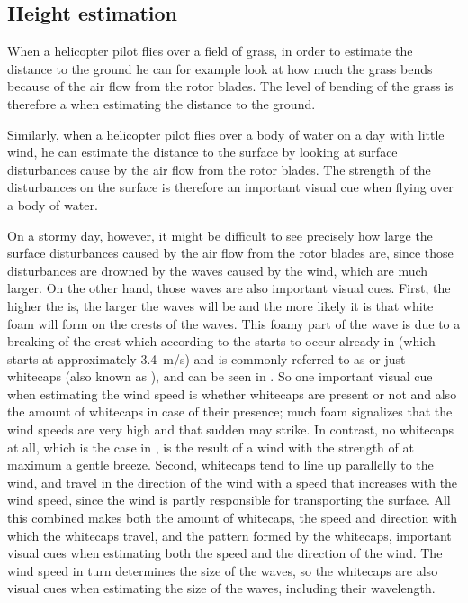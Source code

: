 \subsection{Height estimation}

When a helicopter pilot flies over a field of grass, in order to estimate the distance to the ground he can for example look at how much the grass bends because of the air flow from the rotor blades. The level of bending of the grass is therefore a  when estimating the distance to the ground.

Similarly, when a helicopter pilot flies over a body of water on a day with little wind, he can estimate the distance to the surface by looking at surface disturbances cause by the air flow from the rotor blades. The strength of the disturbances on the surface is therefore an important visual cue when flying over a body of water.


On a stormy day, however, it might be difficult to see precisely how large the surface disturbances caused by the air flow from the rotor blades are, since those disturbances are drowned by the waves caused by the wind, which are much larger. On the other hand, those waves are also important visual cues. First, the higher the  is, the larger the waves will be and the more likely it is that white foam will form on the crests of the waves. This foamy part of the wave is due to a breaking of the crest which according to the  starts to occur already in  (which starts at approximately 3.4~m/s) and is commonly referred to as  or just whitecaps (also known as ), and can be seen in . So one important visual cue when estimating the wind speed is whether whitecaps are present or not and also the amount of whitecaps in case of their presence; much foam signalizes that the wind speeds are very high and that sudden \gusts may strike. In contrast, no whitecaps at all, which is the case in , is the result of a wind with the strength of at maximum a gentle breeze. Second, whitecaps tend to line up parallelly to the wind, and travel in the direction of the wind with a speed that increases with the wind speed, since the wind is partly responsible for transporting the surface. All this combined makes both the amount of whitecaps, the speed and direction with which the whitecaps travel, and the pattern formed by the whitecaps, important visual cues when estimating both the speed and the direction of the wind. The wind speed in turn determines the size of the waves, so the whitecaps are also visual cues when estimating the size of the waves, including their wavelength.

